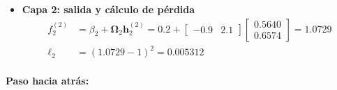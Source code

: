 \documentclass[10pt,a4paper]{article}
\begin{document}
\begin{itemize}
    \item \textbf{Capa 2: salida y cálculo de pérdida}
    \begin{align*}
    f_2^{(2)} &= \beta_2 + \boldsymbol{\Omega}_2 \mathbf{h}_2^{(2)} = 0.2 + \begin{bmatrix} -0.9 & 2.1 \end{bmatrix} \begin{bmatrix} 0.5640 \\ 0.6574 \end{bmatrix} = 1.0729 \\[0.1cm]
    \ell_2 &= (1.0729 - 1)^2 = \mathbf{0.005312}
    \end{align*}
\end{itemize}

\paragraph{Paso hacia atrás:}
\end{document}
